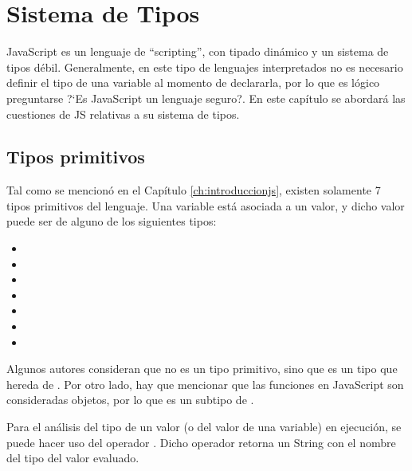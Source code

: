 
\chapter{Sistema de Tipos} %

\label{ch:tipos} %


JavaScript es un lenguaje de "`scripting"', con tipado dinámico y un sistema de tipos débil. Generalmente, en este tipo de lenguajes interpretados no es necesario definir el tipo de una variable al momento de declararla, por lo que es lógico preguntarse ?`Es JavaScript un lenguaje seguro?. En este capítulo se abordará las cuestiones de JS relativas a su sistema de tipos.


\section{Tipos primitivos}

Tal como se mencionó en el Capítulo \ref{ch:introduccionjs}, existen solamente 7 tipos primitivos del lenguaje. Una variable está asociada a un valor, y dicho valor puede ser de alguno de los siguientes tipos:

\begin{itemize}
\item {}
\item {}
\item {}
\item {}
\item {}
\item {}
\item {}
\end{itemize}

Algunos autores consideran que  no es un tipo primitivo, sino que es un tipo que hereda de . Por otro lado, hay que mencionar que las funciones en JavaScript son consideradas objetos, por lo que  es un subtipo de .

Para el análisis del tipo de un valor (o del valor de una variable) en ejecución, se puede hacer uso del operador . Dicho operador retorna un String con el nombre del tipo del valor evaluado.

